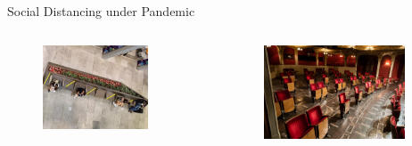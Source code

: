 \begin{frame}{Social Distancing under Pandemic}
\begin{itemize}
        \begin{columns}[c]  %
          \column{5cm}  %
          \begin{figure}[ht]
            \centering
            \includegraphics[width = 0.8\textwidth]{./images/seat_sc.png}
          \end{figure}
          \column{5cm}
          \scriptsize
          \begin{figure}[ht]
            \centering
            \includegraphics[width = 0.9\textwidth]{./images/cinema.jpg}
          \end{figure}
          \end{columns} 
    \end{itemize}
    \end{frame}

